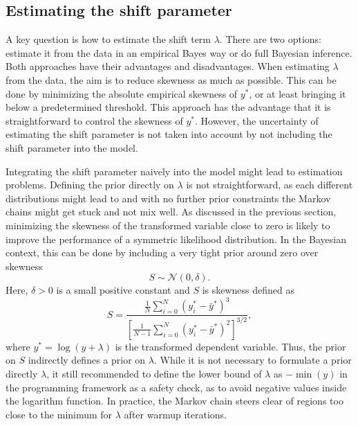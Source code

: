 \subsection{Estimating the shift parameter}
A key question is how to estimate the shift term $\lambda$.
There are two options: estimate it from the data in an empirical Bayes way or do full Bayesian inference.
Both approaches have their advantages and disadvantages.
When estimating $\lambda$ from the data, the aim is to reduce skewness as much as possible.
This can be done by minimizing the absolute empirical skewness of $y^*$, or at least bringing it below a predetermined threshold.
This approach has the advantage that it is straightforward to control the skewness of $y^*$.
However, the uncertainty of estimating the shift parameter is not taken into account by not including the shift parameter into the model.

Integrating the shift parameter naively into the model might lead to estimation problems.
Defining the prior directly on $\lambda$ is not straightforward, as each different distributions might lead to  and with no further prior constraints the Markov chains might get stuck and not mix well.
As discussed in the previous section, minimizing the skewness of the transformed variable close to zero is likely to improve the performance of a symmetric likelihood distribution.
In the Bayesian context, this can be done by including a very tight prior around zero over skewness
\begin{equation*}
    S \sim \mathcal N(0, \delta).
\end{equation*}
Here, $\delta > 0$ is a small positive constant and $S$ is skewness defined as
\begin{equation*}
    \displaystyle S =  \frac{\frac 1 N \sum^{N}_{i = 0} (y_i^* - \bar y^* )^3}
    {\left[ \frac{1}{N - 1} \sum^{N}_{i = 0} (y_i^* - \bar y^* )^2 \right]^{3/2}},
\end{equation*}
where $y^* = \log(y + \lambda)$ is the transformed dependent variable. Thus, the prior on $S$ indirectly defines a prior on $\lambda$.
While it is not necessary to formulate a prior directly $\lambda$, it still recommended to define the lower bound of $\lambda$ as $-\min(y)$ in the programming framework as a safety check, as to avoid negative values inside the logarithm function.
In practice, the Markov chain steers clear of regions too close to the minimum for $\lambda$ after warmup iterations.

